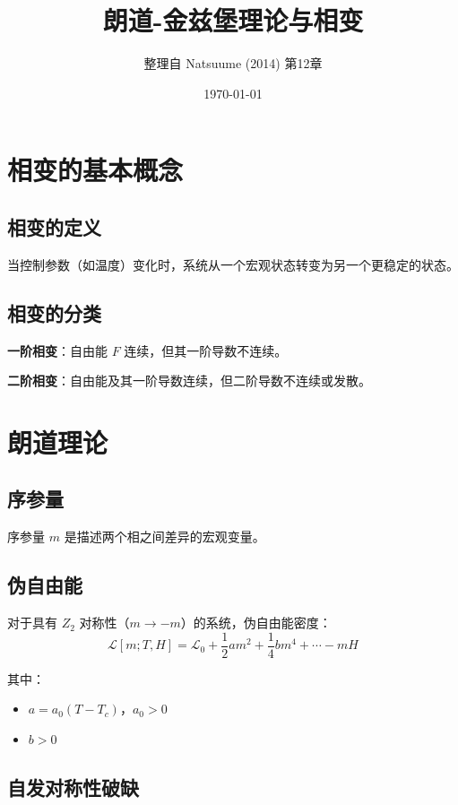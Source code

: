 \documentclass[12pt,a4paper]{ctexart}
\title{朗道-金兹堡理论与相变}
\author{整理自 Natsuume (2014) 第12章}
\date{\today}
\begin{document}
\maketitle

\section{相变的基本概念}

\subsection{相变的定义}

当控制参数（如温度）变化时，系统从一个宏观状态转变为另一个更稳定的状态。

\subsection{相变的分类}

\textbf{一阶相变}：自由能 $F$ 连续，但其一阶导数不连续。

\textbf{二阶相变}：自由能及其一阶导数连续，但二阶导数不连续或发散。

\section{朗道理论}

\subsection{序参量}

序参量 $m$ 是描述两个相之间差异的宏观变量。

\subsection{伪自由能}

对于具有 $Z_2$ 对称性（$m \to -m$）的系统，伪自由能密度：
\begin{equation}
    \mathcal{L}[m; T, H] = \mathcal{L}_0 + \frac{1}{2} a m^2 + \frac{1}{4} b m^4 + \cdots - m H
\end{equation}

其中：
\begin{itemize}
    \item $a = a_0 (T - T_c)$，$a_0 > 0$
    \item $b > 0$
\end{itemize}

\subsection{自发对称性破缺}
\end{document}
